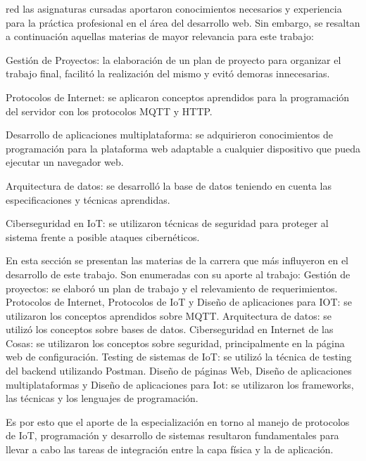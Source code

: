 \begin{consigna}{red}
las asignaturas cursadas aportaron conocimientos necesarios y experiencia para
la práctica profesional en el área del desarrollo web. Sin embargo, se resaltan a
continuación aquellas materias de mayor relevancia para este trabajo:

Gestión de Proyectos: la elaboración de un plan de proyecto para organizar
el trabajo final, facilitó la realización del mismo y evitó demoras innecesarias.

Protocolos de Internet: se aplicaron conceptos aprendidos para la programación
del servidor con los protocolos MQTT y HTTP.

Desarrollo de aplicaciones multiplataforma: se adquirieron conocimientos
de programación para la plataforma web adaptable a cualquier dispositivo
que pueda ejecutar un navegador web.

Arquitectura de datos: se desarrolló la base de datos teniendo en cuenta las
especificaciones y técnicas aprendidas.

Ciberseguridad en IoT: se utilizaron técnicas de seguridad para proteger al
sistema frente a posible ataques cibernéticos.

En esta sección se presentan las materias de la carrera que más influyeron en el
desarrollo de este trabajo. Son enumeradas con su aporte al trabajo:
Gestión de proyectos: se elaboró un plan de trabajo y el relevamiento de
requerimientos.
Protocolos de Internet, Protocolos de IoT y Diseño de aplicaciones para IOT:
se utilizaron los conceptos aprendidos sobre MQTT.
Arquitectura de datos: se utilizó los conceptos sobre bases de datos.
Ciberseguridad en Internet de las Cosas: se utilizaron los conceptos sobre
seguridad, principalmente en la página web de configuración.
Testing de sistemas de IoT: se utilizó la técnica de testing del backend utilizando
Postman.
Diseño de páginas Web, Diseño de aplicaciones multiplataformas y Diseño
de aplicaciones para Iot: se utilizaron los frameworks, las técnicas y los
lenguajes de programación.
\end{consigna}

Es por esto que el aporte de la especialización en torno al manejo de protocolos de IoT, programación y desarrollo de sistemas resultaron fundamentales para llevar a cabo las tareas de integración entre la capa física y la de aplicación.

